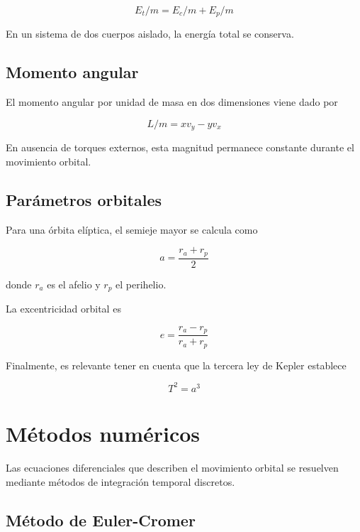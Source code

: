 \documentclass[11pt,a4paper]{article}
\begin{document}
\begin{equation}
E_t/m = E_c/m + E_p/m
\end{equation}

En un sistema de dos cuerpos aislado, la energía total se conserva.

\subsection{Momento angular}

El momento angular por unidad de masa en dos dimensiones viene dado por

\begin{equation}
L/m = x v_y - y v_x
\end{equation}

En ausencia de torques externos, esta magnitud permanece constante durante el movimiento orbital.

\subsection{Parámetros orbitales}

Para una órbita elíptica, el semieje mayor se calcula como

\begin{equation}
a = \frac{r_a + r_p}{2}
\end{equation}

donde $r_a$ es el afelio y $r_p$ el perihelio.

La excentricidad orbital es

\begin{equation}
e = \frac{r_a - r_p}{r_a + r_p}
\end{equation}

Finalmente, es relevante tener en cuenta que la tercera ley de Kepler establece

\begin{equation}
T^2 = a^3
\end{equation}

\section{Métodos numéricos}

Las ecuaciones diferenciales que describen el movimiento orbital se resuelven mediante métodos de integración temporal discretos.

\subsection{Método de Euler-Cromer}
\end{document}
